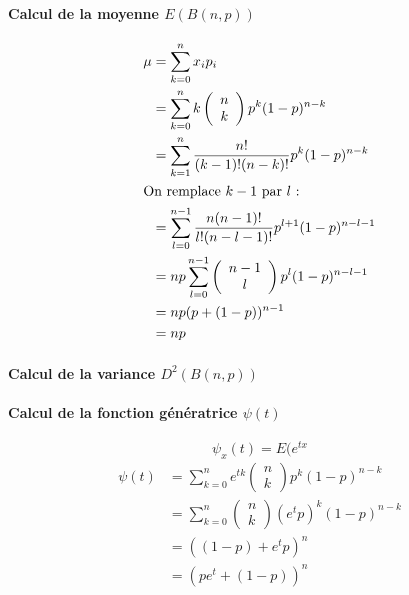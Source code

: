 \paragraph{Calcul de la moyenne $E(B(n,p))$}
\begin{align*}
\mu &=\displaystyle\sum_{k=0}^{n} x_ip_i\\
    &=\displaystyle\sum_{k=0}^{n} k \left(\begin{array}{c}n\\k\end{array}\right)p^k(1-p)^{n-k}\\
    &=\displaystyle\sum_{k=1}^{n} \dfrac{n!}{(k-1)!(n-k)!}p^k(1-p)^{n-k}\\
\intertext{On remplace $k-1$ par $l$ :}
    &=\displaystyle\sum_{l=0}^{n-1}  \dfrac{n(n-1)!}{l!(n-l-1)!}p^{l+1}(1-p)^{n-l-1}\\
    &=np\displaystyle\sum_{l=0}^{n-1} \left(\begin{array}{c}n-1\\l\end{array}\right)p^{l}(1-p)^{n-l-1}\\
    &=np(p+(1-p))^{n-1}\\
    &=np\\
\end{align*}

\paragraph{Calcul de la variance $D^2(B(n,p))$}
\paragraph{Calcul de la fonction génératrice $\psi(t)$}
$$\boxed{\psi_x(t) = E(e^{tx}}$$
\begin{align*}
\psi(t) &= \sum_{k=0}^n e^{tk} \left(\begin{array}{c}n\\k\end{array}\right) p^k (1-p)^{n-k}\\
        &= \sum_{k=0}^n \left(\begin{array}{c}n\\k\end{array}\right) (e^tp)^k(1-p)^{n-k}\\
        &= ((1-p)+e^tp)^n\\
        &=(pe^t+(1-p))^n\\
\end{align*}

